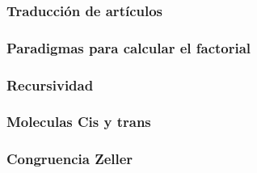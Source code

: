\documentclass{article}
\begin{document}
\subsubsection{Traducción de artículos}
 \clearpage
 \clearpage
 \clearpage
 \clearpage
 \clearpage

\subsubsection{Paradigmas para calcular el factorial}


\subsubsection{Recursividad}


\subsubsection{Moleculas Cis y trans}


\subsubsection{Congruencia Zeller}


\clearpage
\printbibliography
\end{document}
